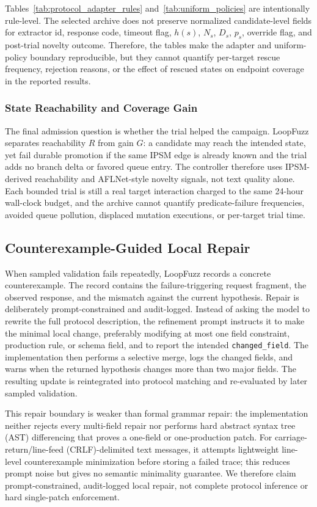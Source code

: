 \documentclass[final,5p,times,number]{elsarticle}
\begin{document}
Tables~\ref{tab:protocol_adapter_rules} and~\ref{tab:uniform_policies} are intentionally rule-level. The selected archive does not preserve normalized candidate-level fields for extractor id, response code, timeout flag, $h(s)$, $N_s$, $D_s$, $p_s$, override flag, and post-trial novelty outcome. Therefore, the tables make the adapter and uniform-policy boundary reproducible, but they cannot quantify per-target rescue frequency, rejection reasons, or the effect of rescued states on endpoint coverage in the reported results.

\subsubsection{State Reachability and Coverage Gain}
The final admission question is whether the trial helped the campaign. LoopFuzz separates reachability $R$ from gain $G$: a candidate may reach the intended state, yet fail durable promotion if the same IPSM edge is already known and the trial adds no branch delta or favored queue entry. The controller therefore uses IPSM-derived reachability and AFLNet-style novelty signals, not text quality alone. Each bounded trial is still a real target interaction charged to the same 24-hour wall-clock budget, and the archive cannot quantify predicate-failure frequencies, avoided queue pollution, displaced mutation executions, or per-target trial time.

\subsection{Counterexample-Guided Local Repair}
When sampled validation fails repeatedly, LoopFuzz records a concrete counterexample. The record contains the failure-triggering request fragment, the observed response, and the mismatch against the current hypothesis. Repair is deliberately prompt-constrained and audit-logged. Instead of asking the model to rewrite the full protocol description, the refinement prompt instructs it to make the minimal local change, preferably modifying at most one field constraint, production rule, or schema field, and to report the intended \texttt{changed\_field}. The implementation then performs a selective merge, logs the changed fields, and warns when the returned hypothesis changes more than two major fields. The resulting update is reintegrated into protocol matching and re-evaluated by later sampled validation.

This repair boundary is weaker than formal grammar repair: the implementation neither rejects every multi-field repair nor performs hard abstract syntax tree (AST) differencing that proves a one-field or one-production patch. For carriage-return/line-feed (CRLF)-delimited text messages, it attempts lightweight line-level counterexample minimization before storing a failed trace; this reduces prompt noise but gives no semantic minimality guarantee. We therefore claim prompt-constrained, audit-logged local repair, not complete protocol inference or hard single-patch enforcement.
\end{document}
